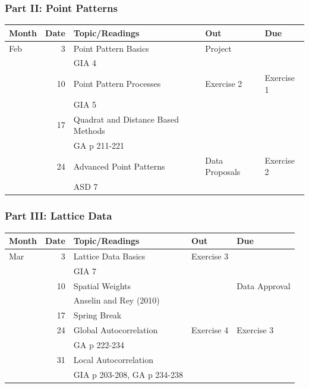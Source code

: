 \documentclass[nototal]{beamer}
\begin{document}
\begin{frame}
	\frametitle{Part II: Point Patterns}
  \begin{center}
    \begin{footnotesize}
\begin{tabular}{|lr|l|l|l|}
\hline
Month & \multicolumn{1}{l|}{Date} & Topic/Readings & Out & Due \\ \hline
Feb & 3 & Point Pattern Basics &Project &  \\ 
    &    & GIA 4 & &\\
 & 10 & Point Pattern Processes & Exercise 2 & Exercise 1 \\ 
    &    & GIA 5 & & \\
     & 17 & Quadrat and Distance Based Methods &  & \\ 
    &    & GA p 211-221 & &\\
 & 24 & Advanced Point Patterns &Data Proposals  & Exercise 2  \\ 
    &    & ASD 7 & &\\
 \hline
\end{tabular}
    \end{footnotesize}
  \end{center}
 \end{frame} 
 

\begin{frame}
	\frametitle{Part III: Lattice Data}
  \begin{center}
    \begin{footnotesize}
\begin{tabular}{|lr|l|l|l|}
\hline
Month & \multicolumn{1}{l|}{Date} & Topic/Readings & Out & Due \\ \hline
Mar & 3 & Lattice Data Basics & Exercise 3 & \\ 
    &    & GIA 7 & &\\
 & 10 & Spatial Weights &  &Data Approval   \\ 
    &    & Anselin and Rey (2010) & &\\
 & 17 & Spring Break &  &  \\ 
 & 24 & Global Autocorrelation & Exercise 4 & Exercise 3 \\ 
    &    &  GA p 222-234 & &\\
 & 31 & Local Autocorrelation &  &  \\ 
    &    & GIA p 203-208, GA p 234-238& &\\
 \hline
\end{tabular}
    \end{footnotesize}
  \end{center}
 \end{frame} 
\end{document}
